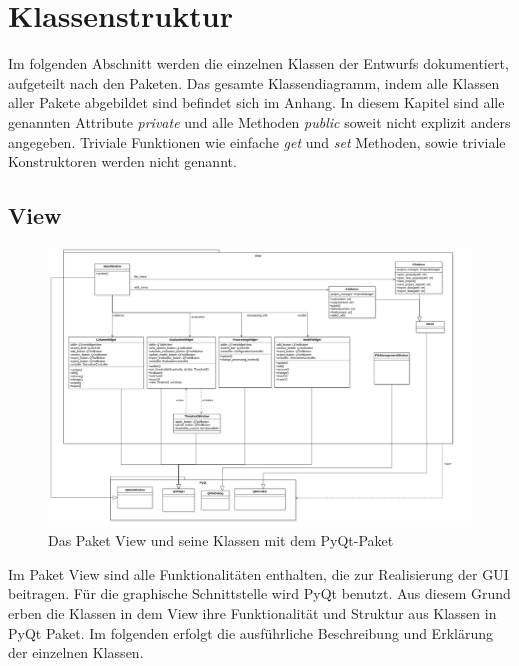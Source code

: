 \documentclass{article}
\begin{document}
\newpage
\section{Klassenstruktur}
Im folgenden Abschnitt werden die einzelnen Klassen der Entwurfs dokumentiert, aufgeteilt nach den Paketen. Das gesamte Klassendiagramm, indem alle Klassen aller Pakete abgebildet sind befindet sich im Anhang. In diesem Kapitel sind alle genannten Attribute \emph{private} und alle Methoden \emph{public} soweit nicht explizit anders angegeben. Triviale Funktionen wie einfache \emph{get} und \emph{set} Methoden, sowie triviale Konstruktoren werden nicht genannt.

\subsection{View}
\begin{figure}[H]%
    \centering
    \includegraphics[width=15cm]{entwurf/Entwurf_dokument/img/Alissa/View.png}
    \caption{Das Paket View und seine Klassen mit dem PyQt-Paket}
\end{figure}
Im Paket View sind alle Funktionalitäten enthalten, die zur Realisierung der GUI beitragen. Für die graphische Schnittstelle wird PyQt benutzt. Aus diesem Grund erben die Klassen in dem View ihre Funktionalität und Struktur aus Klassen in PyQt Paket. Im folgenden erfolgt die ausführliche Beschreibung und Erklärung der einzelnen Klassen.
\end{document}
